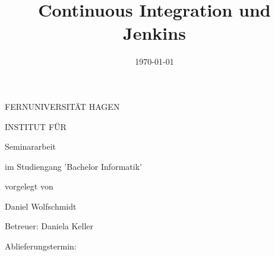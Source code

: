 \documentclass[german,11pt,a4paper]{article} %
\begin{document}
\begin{center}\uppercase{Fernuniversität Hagen}\end{center}
\begin{center}\uppercase{Institut für }\end{center}

\vspace{3cm}


\title{Continuous Integration und Jenkins}
\date{\vspace{-5ex}}
{\let\newpage\relax\maketitle}
\thispagestyle{empty}


\begin{center}
\begin{large}
\begin{Large}
Seminararbeit\\
\end{Large}
im Studiengang 'Bachelor Informatik' \\
\end{large}
\end{center}
\begin{center}
vorgelegt von\\
\begin{large}
Daniel Wolfschmidt\\
\end{large}
\end{center}
\vspace{1cm}
\begin{center}
\begin{large}
Betreuer: Daniela Keller\\
\end{large}
\end{center}

\begin{center}
\begin{large}
Ablieferungstermin: \date{\today} \\
\end{large}
\end{center}
\end{document}

